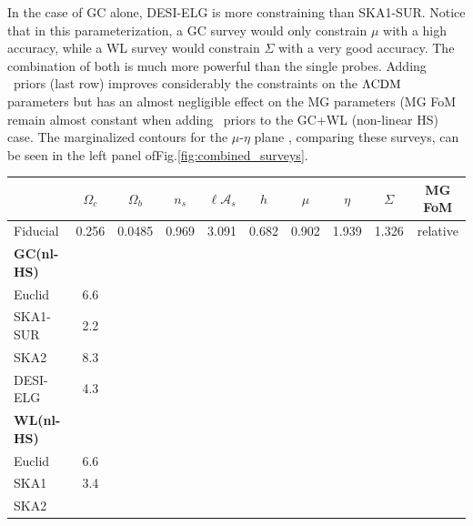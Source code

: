 \begin{table}[htbp]
{In the case of GC alone, DESI-ELG is more constraining than SKA1-SUR.
Notice that in this parameterization, a GC survey would only constrain $\mu$ with
a high accuracy, while a WL survey would constrain $\Sigma$ with
a very good accuracy. The combination of both is much more
powerful than the single probes. Adding \planck\ priors (last row) improves considerably the
constraints on the $\Lambda\mathrm{CDM}$ parameters but has an almost negligible effect on the MG parameters (MG FoM remain almost constant when adding \planck\ priors to the GC+WL (non-linear HS) case. The marginalized contours for the $\mu$-$\eta$ plane , comparing these surveys, can be seen in the left panel ofFig.\ref{fig:combined_surveys}.
}
\end{table}
\normalsize

\begin{table}[htbp]
\centering{}%
\tiny
\begin{tabular}{|l|c|c|c|c|c||c|c|c|c|}
\hline
	 & $\Omega_{c}$ & $\Omega_{b}$ & $n_{s}$ & $\ell\mathcal{A}_{s}$ & $h$ & $\mu$ & $\eta$ & $\Sigma$  & MG FoM \TBstrut\tabularnewline
\hline 
Fiducial & {0.256} & {0.0485} & {0.969} & {3.091} & {0.682} & {0.902} & {1.939} & {1.326} & relative \TBstrut\tabularnewline 
\hline 
\hline 
\textbf{GC(nl-HS)} &  &  &  &  &  &  &  & & \TBstrut\tabularnewline
Euclid   

& 6.6
\tabularnewline
SKA1-SUR  

& 2.2
\tabularnewline
SKA2  

& 8.3
\tabularnewline
DESI-ELG   

& 4.3
\tabularnewline
\hline 
\hline 
\textbf{WL(nl-HS)} &  &  &  &  &  &  &  &  & \TBstrut\tabularnewline
Euclid   

& 6.6
\tabularnewline
SKA1  

& 3.4
\tabularnewline
SKA2  


\end{tabular}
\end{table}
